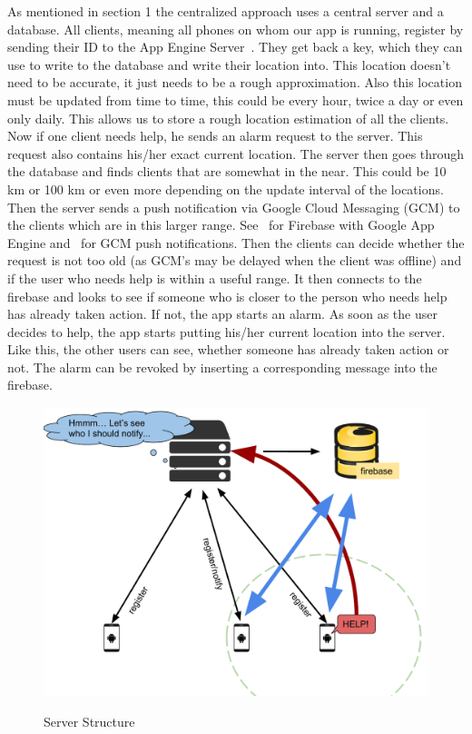 \documentclass{report}
\newcommand{\lfig}[1]{\label{fig:#1}}
\begin{document}
As mentioned in section 1 the centralized approach uses a central server and a database. All clients, meaning all phones on whom our app is running, register by sending their ID to the App Engine Server~\cite{google_app_engine}. They get back a key, which they can use to write to the database and write their location into. This location doesn't need to be accurate, it just needs to be a rough approximation. Also this location must be updated from time to time, this could be every hour, twice a day or even only daily. This allows us to store a rough location estimation of all the clients. Now if one client needs help, he sends an alarm request to the server. This request also contains his/her exact current location. The server then goes through the database and finds clients that are somewhat in the near. This could be 10 km or 100 km or even more depending on the update interval of the locations. Then the server sends a push notification via Google Cloud Messaging (GCM) to the clients which are in this larger range. See~\cite{firebase_app_engine_tutorial} for Firebase with Google App Engine and~\cite{gcm_template} for GCM push notifications. Then the clients can decide whether the request is not too old (as GCM's may be delayed when the client was offline) and if the user who needs help is within a useful range. It then connects to the firebase and looks to see if someone who is closer to the person who needs help has already taken action. If not, the app starts an alarm. As soon as the user decides to help, the app starts putting his/her current location into the server. Like this, the other users can see, whether someone has already taken action or not. The alarm can be revoked by inserting a corresponding message into the firebase. 
\newline

\begin{figure}[h]
	\centering
    \includegraphics[width=\columnwidth]{server1.pdf}
    \lfig{server-structure}
    \vspace{-5mm} %
	\caption{Server Structure}
\end{figure}
\end{document}
